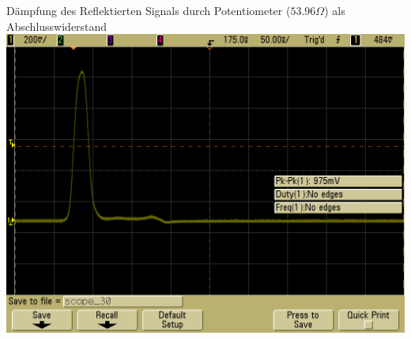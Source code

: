 \documentclass[compress,11pt]{beamer}
\begin{document}
\begin{frame}
\begin{block}{Dämpfung des Reflektierten Signals durch Potentiometer ($53.96\Omega$) als Abschlusswiderstand}
\centering
\includegraphics[width=.85\textwidth]{../daten/scope_30.png}
\end{block}
\end{frame}
\end{document}
